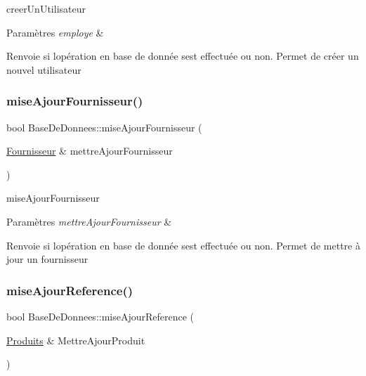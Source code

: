 creer\+Un\+Utilisateur 


\begin{DoxyParams}{Paramètres}
{\em employe} & \\
\hline
\end{DoxyParams}
\begin{DoxyReturn}{Renvoie}
si l\textquotesingle{}opération en base de donnée s\textquotesingle{}est effectuée ou non. Permet de créer un nouvel utilisateur 
\end{DoxyReturn}
\mbox{\label{class_base_de_donnees_ab49e6dfff0eecf616d9a7642ea358f31}} 
\subsubsection{\texorpdfstring{mise\+Ajour\+Fournisseur()}{miseAjourFournisseur()}}
{\footnotesize\ttfamily bool Base\+De\+Donnees\+::mise\+Ajour\+Fournisseur (\begin{DoxyParamCaption}\item[{\mbox{\hyperlink{class_fournisseur}{Fournisseur}} \&}]{mettre\+Ajour\+Fournisseur }\end{DoxyParamCaption})}



mise\+Ajour\+Fournisseur 


\begin{DoxyParams}{Paramètres}
{\em mettre\+Ajour\+Fournisseur} & \\
\hline
\end{DoxyParams}
\begin{DoxyReturn}{Renvoie}
si l\textquotesingle{}opération en base de donnée s\textquotesingle{}est effectuée ou non. Permet de mettre à jour un fournisseur 
\end{DoxyReturn}
\mbox{\label{class_base_de_donnees_ae68726c99e17a89342655d8b842ced96}} 
\subsubsection{\texorpdfstring{mise\+Ajour\+Reference()}{miseAjourReference()}}
{\footnotesize\ttfamily bool Base\+De\+Donnees\+::mise\+Ajour\+Reference (\begin{DoxyParamCaption}\item[{\mbox{\hyperlink{class_produits}{Produits}} \&}]{Mettre\+Ajour\+Produit }\end{DoxyParamCaption})}



